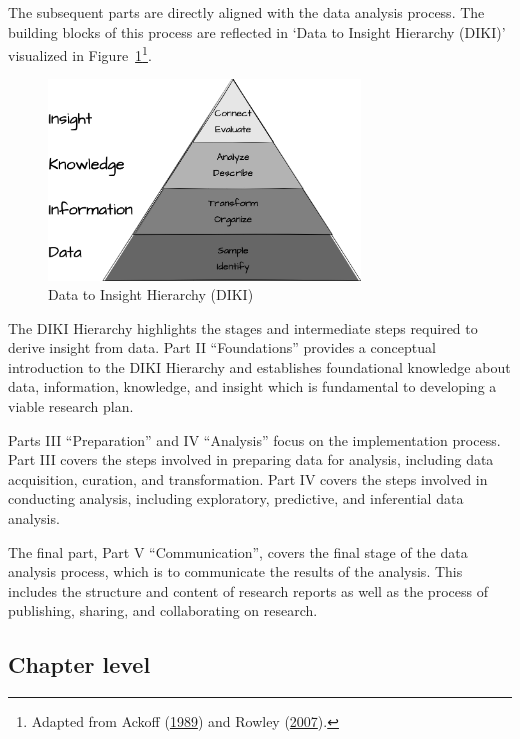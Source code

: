 \documentclass[
  letterpaper,
  DIV=11,
  numbers=noendperiod]{scrreport}
\theoremstyle{definition}
\theoremstyle{remark}
\begin{document}
The subsequent parts are directly aligned with the data analysis
process. The building blocks of this process are reflected in `Data to
Insight Hierarchy (DIKI)' visualized in
Figure~\ref{fig-diki-hierarchy}\footnote{Adapted from Ackoff
  (\protect\hyperlink{ref-Ackoff1989}{1989}) and Rowley
  (\protect\hyperlink{ref-Rowley2007}{2007}).}.

\begin{figure}[H]

{\centering \includegraphics[width=3.26in,height=\textheight]{figures/preface/p-diki.drawio.png}

}

\caption{\label{fig-diki-hierarchy}Data to Insight Hierarchy (DIKI)}

\end{figure}

The DIKI Hierarchy highlights the stages and intermediate steps required
to derive insight from data. Part II ``Foundations'' provides a
conceptual introduction to the DIKI Hierarchy and establishes
foundational knowledge about data, information, knowledge, and insight
which is fundamental to developing a viable research plan.

Parts III ``Preparation'' and IV ``Analysis'' focus on the
implementation process. Part III covers the steps involved in preparing
data for analysis, including data acquisition, curation, and
transformation. Part IV covers the steps involved in conducting
analysis, including exploratory, predictive, and inferential data
analysis.

The final part, Part V ``Communication'', covers the final stage of the
data analysis process, which is to communicate the results of the
analysis. This includes the structure and content of research reports as
well as the process of publishing, sharing, and collaborating on
research.

\hypertarget{sec-p-structure-chapter}{%
\subsection*{Chapter level}\label{sec-p-structure-chapter}}
\end{document}
